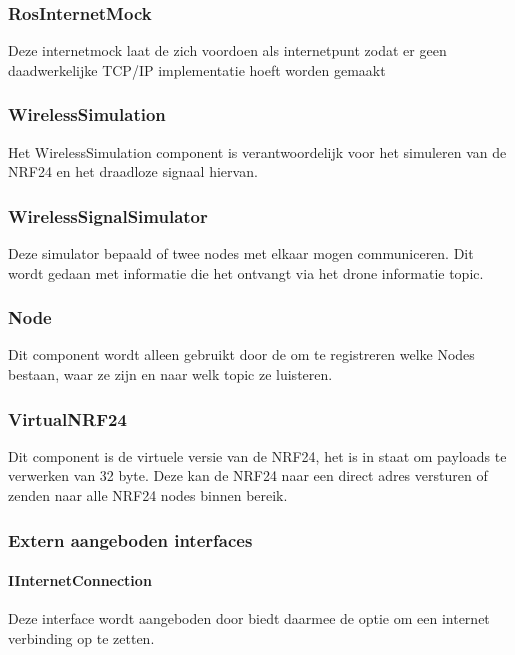 \documentclass[a4paper, 11pt, oneside]{report}
\begin{document}
\subsubsection{RosInternetMock}
\label{architectural:subcomponenten:RosInternetMock}
Deze internetmock laat de  zich voordoen als internetpunt zodat er geen daadwerkelijke TCP/IP implementatie hoeft worden gemaakt 
\subsubsection{WirelessSimulation}
\label{architectural:subcomponenten:WirelessSimulation}
Het WirelessSimulation component is verantwoordelijk voor het simuleren van de NRF24 en het draadloze signaal hiervan. 
\subsubsection{WirelessSignalSimulator}
\label{architectural:subcomponenten:WirelessSignalSimulator}
Deze simulator bepaald of twee nodes met elkaar mogen communiceren. Dit wordt gedaan met informatie die het ontvangt via het drone informatie topic. 
\subsubsection{Node}
\label{architectural:subcomponenten:Node}
Dit component wordt alleen gebruikt door de  om te registreren welke Nodes bestaan, waar ze zijn en naar welk topic ze luisteren.
\subsubsection{VirtualNRF24}
\label{architectural:subcomponenten:VirtualNRF24}
Dit component is de virtuele versie van de NRF24, het is in staat om payloads te verwerken van 32 byte.
Deze kan de NRF24 naar een direct adres versturen of zenden naar alle NRF24 nodes binnen bereik.

\subsubsection{Extern aangeboden interfaces}
\label{DetailedDesign:ros:extern:interfaces}

\paragraph{IInternetConnection}
\label{DetailedDesign:ros:extern:interfaces:IInternetConnection}
Deze interface wordt aangeboden door  biedt daarmee de optie om een internet verbinding op te zetten. 
 
\end{document}
